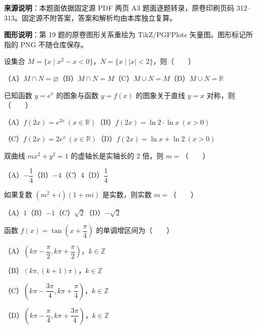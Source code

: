 


\begin{gktip}
\textbf{来源说明}：本题面依据固定源 PDF 两页 A3 题面逐题转录，原卷印刷页码 312–313。固定源不附答案，答案和解析均由本库独立复算。

\textbf{图形说明}：第 19 题的原卷图形关系重绘为 TikZ/PGFPlots 矢量图。图形标记所指的 PNG 不随仓库保存。
\end{gktip}


\begin{question}
设集合 $M=\{x\mid x^2-x<0\}$，$N=\{x\mid |x|<2\}$，则\mbox{（　　）}

（A）$M\cap N=\varnothing$\quad（B）$M\cap N=M$\quad（C）$M\cup N=M$\quad（D）$M\cup N=\mathbb R$

\end{question}
\begin{question}
已知函数 $y=e^x$ 的图象与函数 $y=f(x)$ 的图象关于直线 $y=x$ 对称，则\mbox{（　　）}

（A）$f(2x)=e^{2x}\ (x\in\mathbb R)$\quad（B）$f(2x)=\ln2\cdot\ln x\ (x>0)$

（C）$f(2x)=2e^x\ (x\in\mathbb R)$\quad（D）$f(2x)=\ln x+\ln2\ (x>0)$

\end{question}
\begin{question}
双曲线 $mx^2+y^2=1$ 的虚轴长是实轴长的 $2$ 倍，则 $m=$\mbox{（　　）}

（A）$-\dfrac14$\quad（B）$-4$\quad（C）$4$\quad（D）$\dfrac14$

\end{question}
\begin{question}
如果复数 $(m^2+i)(1+mi)$ 是实数，则实数 $m=$\mbox{（　　）}

（A）$1$\quad（B）$-1$\quad（C）$\sqrt2$\quad（D）$-\sqrt2$

\end{question}
\begin{question}
函数 $f(x)=\tan\left(x+\dfrac\pi4\right)$ 的单调增区间为\mbox{（　　）}

（A）$\left(k\pi-\dfrac\pi2,k\pi+\dfrac\pi2\right)$，$k\in\mathbb Z$

（B）$(k\pi,(k+1)\pi)$，$k\in\mathbb Z$

（C）$\left(k\pi-\dfrac{3\pi}4,k\pi+\dfrac\pi4\right)$，$k\in\mathbb Z$

（D）$\left(k\pi-\dfrac\pi4,k\pi+\dfrac{3\pi}4\right)$，$k\in\mathbb Z$

\end{question}
